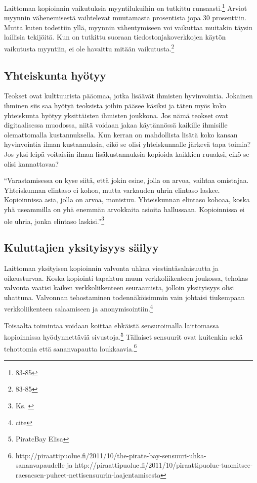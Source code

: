 \documentclass[titlepage,12pt]{article}
\begin{document}
Laittoman kopioinnin vaikutuksia myyntilukuihin on tutkittu
runsaasti.\footnote{83-85} Arviot myynnin vähenemisestä vaihtelevat
muutamasta prosentista jopa 30 prosenttiin.  Mutta kuten todettiin
yllä, myynnin vähentymiseen voi vaikuttaa muitakin täysin laillisia
tekijöitä.  Kun on tutkittu suoraan tiedostonjakoverkkojen käytön
vaikutusta myyntiin, ei ole havaittu mitään
vaikutusta.\footnote{83-85}


\subsection{Yhteiskunta hyötyy}



Teokset ovat kulttuurista pääomaa, jotka lisäävät ihmisten
hyvinvointia.  Jokainen ihminen siis saa hyötyä teoksista joihin
pääsee käsiksi ja täten myös koko yhteiskunta hyötyy yksittäisten
ihmisten joukkona.  Jos nämä teokset ovat digitaalisessa muodossa,
niitä voidaan jakaa käytännössä kaikille ihmisille olemattomalla
kustannuksella.  Kun kerran on mahdollista lisätä koko kansan
hyvinvointia ilman kustannuksia, eikö se olisi yhteiskunnalle järkevä
tapa toimia?  Jos yksi leipä voitaisiin ilman lisäkustannuksia
kopioida kaikkien ruuaksi, eikö se olisi kannattavaa?

``Varastamisessa on kyse siitä, että jokin esine, jolla on arvoa,
vaihtaa omistajaa.  Yhteiskunnan elintaso ei kohoa, mutta varkauden
uhrin elintaso laskee. Kopioinnissa asia, jolla on arvoa, monistuu.
Yhteiskunnan elintaso kohoaa, koska yhä useammilla on yhä enemmän
arvokkaita asioita hallussaan.  Kopioinnissa ei ole uhria, jonka
elintaso laskisi.''\footnote{Ks. \cite{wat?}}

\subsection{Kuluttajien yksityisyys säilyy}

Laittoman yksityisen kopioinnin valvonta uhkaa viestintäsalaisuutta ja
oikeusturvaa.  Koska kopiointi tapahtuu muun verkkoliikenteen
joukossa, tehokas valvonta vaatisi kaiken verkkoliikenteen
seuraamista, jolloin yksityisyys olisi uhattuna.  Valvonnan
tehostaminen todennäköisimmin vain johtaisi tiukempaan
verkkoliikenteen salaamiseen ja anonymisointiin.\footnote{cite}

Toisaalta toimintaa voidaan koittaa ehkäistä sensuroimalla laittomassa
kopioinnissa hyödynnettäviä sivustoja.\footnote{PirateBay Elisa}
Tällaiset sensuurit ovat kuitenkin sekä tehottomia että sananvapautta
loukkaavia.\footnote{http://piraattipuolue.fi/2011/10/the-pirate-bay-sensuuri-uhka-sananvapaudelle
  ja
  http://piraattipuolue.fi/2011/10/piraattipuolue-tuomitsee-raesaesen-puheet-nettisensuurin-laajentamisesta}
\end{document}
